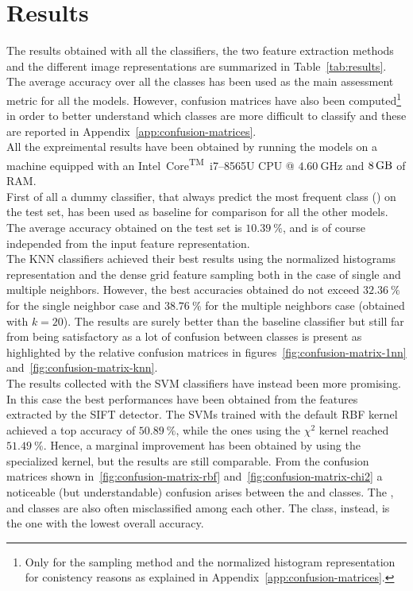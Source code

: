 \documentclass[../main.tex]{subfiles}
\begin{document}
\section{Results}\label{sec:results}

The results obtained with all the classifiers, the two feature extraction methods and the different image representations are summarized in Table~\ref{tab:results}.
The average accuracy over all the classes has been used as the main assessment metric for all the models. However, confusion matrices have also been computed\footnote{Only for the  sampling method and the normalized histogram representation for conistency reasons as explained in Appendix~\ref{app:confusion-matrices}.} in order to better understand which classes are more difficult to classify and these are reported in Appendix~\ref{app:confusion-matrices}.\\
All the expreimental results have been obtained by running the models on a machine equipped with an Intel\textsuperscript{\textregistered}~Core\textsuperscript{TM}~i7--8565U CPU @ $\SI{4.60}{\giga\hertz}$ and $\SI{8}{\giga\byte}$ of RAM.\\
First of all a dummy classifier, that always predict the most frequent class () on the test set, has been used as baseline for comparison for all the other models. The average accuracy obtained on the test set is $\SI{10.39}{\percent}$, and is of course independed from the input feature representation.\\
The KNN classifiers achieved their best results using the normalized histograms representation and the dense grid feature sampling both in the case of single and multiple neighbors. However, the best accuracies obtained do not exceed $\SI{32.36}{\percent}$ for the single neighbor case and $\SI{38.76}{\percent}$ for the multiple neighbors case (obtained with $k = 20$). The results are surely better than the baseline classifier but still far from being satisfactory as a lot of confusion between classes is present as highlighted by the relative confusion matrices in figures~\ref{fig:confusion-matrix-1nn} and~\ref{fig:confusion-matrix-knn}.\\
The results collected with the SVM classifiers have instead been more promising. 
In this case the best performances have been obtained from the features extracted by the SIFT detector. The SVMs trained with the default RBF kernel achieved a top accuracy of $\SI{50.89}{\percent}$, while the ones using the $\chi^2$ kernel reached $\SI{51.49}{\percent}$. Hence, a marginal improvement has been obtained by using the specialized kernel, but the results are still comparable. From the confusion matrices shown in~\ref{fig:confusion-matrix-rbf} and~\ref{fig:confusion-matrix-chi2} a noticeable (but understandable) confusion arises between the  and  classes. The ,  and  classes are also often misclassified among each other. The  class, instead, is the one with the lowest overall accuracy.\\
\end{document}
